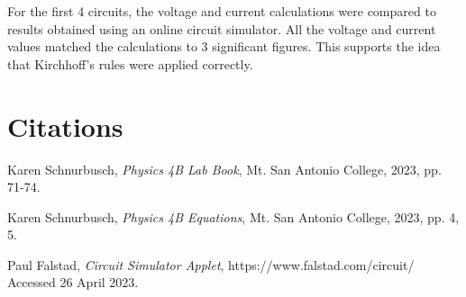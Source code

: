 \documentclass[12pt]{iopart} %
\begin{document}
For the first 4 circuits, the voltage and current calculations were compared to results obtained using an online circuit simulator.
All the voltage and current values matched the calculations to 3 significant figures.
This supports the idea that Kirchhoff's rules were applied correctly.

\section{Citations}

\begin{thebibliography}{9}

  Karen Schnurbusch,
  \textit{Physics 4B Lab Book},
  Mt. San Antonio College,
  2023,
  pp. 71-74.

  Karen Schnurbusch,
  \textit{Physics 4B Equations},
  Mt. San Antonio College,
  2023,
  pp. 4, 5.

  Paul Falstad,
  \textit{Circuit Simulator Applet},
  https://www.falstad.com/circuit/
  Accessed 26 April 2023.

\end{thebibliography}
\end{document}
